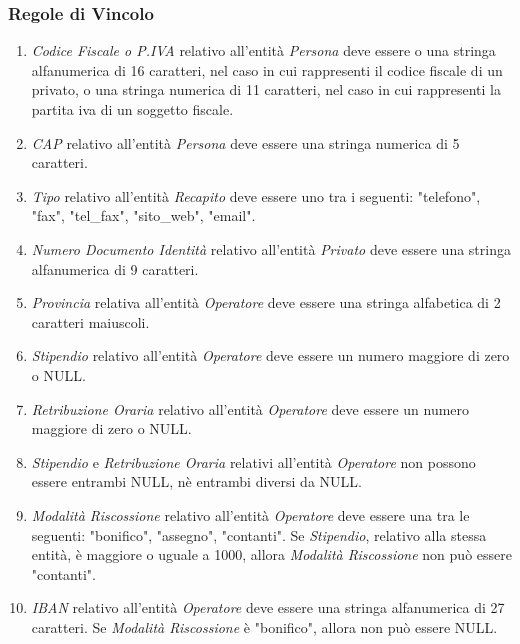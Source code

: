 		\subsubsection{Regole di Vincolo}
		
			\begin{enumerate}
				
				
				\item \emph{Codice Fiscale o P.IVA} relativo all'entità \emph{Persona} deve essere o una stringa alfanumerica di 16 caratteri, nel caso in cui rappresenti il codice fiscale di un privato, o una stringa numerica di 11 caratteri, nel caso in cui rappresenti la partita iva di un soggetto fiscale.
				\item \emph{CAP} relativo all'entità \emph{Persona} deve essere una stringa numerica di 5 caratteri.
				
				\item \emph{Tipo} relativo all’entità \emph{Recapito} deve essere uno tra i seguenti: "telefono", "fax", "tel\_fax", "sito\_web", "email".
				
				\item \emph{Numero Documento Identità} relativo all’entità \emph{Privato} deve essere una stringa alfanumerica di 9 caratteri.
				
				\item \emph{Provincia} relativa all'entità \emph{Operatore} deve essere una stringa alfabetica di 2 caratteri maiuscoli.
				\item \emph{Stipendio} relativo all'entità \emph{Operatore} deve essere un numero maggiore di zero o NULL.
				\item \emph{Retribuzione Oraria} relativo all'entità \emph{Operatore}  deve essere un numero maggiore di zero o NULL.
				\item \emph{Stipendio} e \emph{Retribuzione Oraria} relativi all'entità \emph{Operatore} non possono essere entrambi NULL, nè entrambi diversi da NULL.
				\item \emph{Modalità Riscossione} relativo all'entità \emph{Operatore} deve essere una tra le seguenti: "bonifico", "assegno", "contanti". Se \emph{Stipendio}, relativo alla stessa entità, è maggiore o uguale a 1000, allora \emph{Modalità Riscossione} non può essere "contanti".
				\item \emph{IBAN} relativo all’entità \emph{Operatore} deve essere una stringa alfanumerica di 27 caratteri. Se \emph{Modalità Riscossione} è "bonifico", allora non può essere NULL.
				

\end{enumerate}
